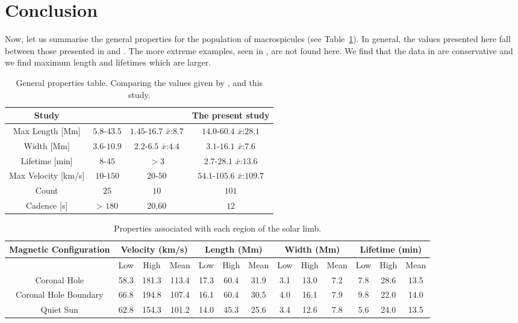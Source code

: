 \section{Conclusion}
Now, let us summarise the general properties for the population of macrospicules (see Table~\ref{table:final properties}). In general, the values presented here fall between those presented in \cite{Bohlin1975} and \cite{Dere89}. The more extreme examples, seen in \cite{Bohlin1975}, are not found here. We find that the data in \cite{Dere89} are conservative and we find maximum length and lifetimes which are larger. 

\begin{table}[t!]
	\centering
	\begin{tabular}{c c c c}
		\hline\hline
		Study & \cite{Bohlin1975} & \cite{Dere89} & The present study \\    
		\hline                                
		Max Length [Mm] & $5.8$-$43.5$ & $1.45$-$16.7$ $\bar{x}$:$8.7$ & $14.0$-$60.4$ $\bar{x}$:$28.1$ \\
		Width [Mm] & $3.6$-$10.9$ & $2.2$-$6.5$ $\bar{x}$:$4.4$ & $3.1$-$16.1$ $\bar{x}$:$7.6$ \\
		Lifetime [min] & $8$-$45$ & $> 3$ & $2.7$-$28.1$ $\bar{x}$:$13.6$ \\
		Max Velocity [km/s] & $10$-$150$ & $20$-$50$ & $54.1$-$105.6$ $\bar{x}$:$109.7$ \\
		Count & $25$ & $10$ & $101$ \\
		Cadence [s] & > $180$ & $20$,$60$ & $12$ \\
		\hline 
	\end{tabular}
	\caption{General properties table. Comparing the values given by \cite{Bohlin1975}, \cite{Dere89} and this study.}
	\label{table:final properties}
\end{table}

\begin{table}[t!]
	\begin{center}
		\begin{tabular}{|c|c|c|c|c|c|c|c|c|c|c|c|c|}
			\hline 
			Magnetic Configuration & \multicolumn{3}{c|}{Velocity (km/s)} & \multicolumn{3}{c|}{Length (Mm)} & \multicolumn{3}{c|}{Width (Mm)} & \multicolumn{3}{c|}{Lifetime (min)}\tabularnewline
			\hline 
			\hline 
			& \multicolumn{1}{c|}{Low} & High & Mean & Low & High & Mean & \multicolumn{1}{c|}{Low} & High & Mean & Low & High & Mean\tabularnewline
			\hline 
			Coronal Hole & 58.3 & 181.3 & 113.4 & 17.3 & 60.4 & 31.9 & 3.1 & 13.0 & 7.2 & 7.8 & 28.6 & 13.5\tabularnewline
			\hline 
			Coronal Hole Boundary & 66.8 & 194.8 & 107.4 & 16.1 & 60.4 & 30.5 & 4.0 & 16.1 & 7.9 & 9.8 & 22.0 & 14.0\tabularnewline
			\hline 
			Quiet Sun & 62.8 & 154.3 & 101.2 & 14.0 & 45.3 & 25.6 & 3.4 & 12.6 & 7.8 & 5.6 & 24.0 & 13.5\tabularnewline
			\hline 
		\end{tabular}
		\caption{Properties associated with each region of the solar limb.}
	\end{center}
\end{table}


